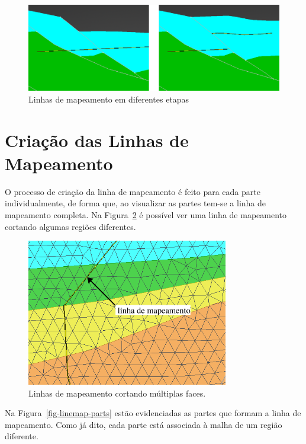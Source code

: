 \begin{figure} [h]
  \begin{center}
    \includegraphics[width=\textwidth]{images/fig-linemap-history}
    \caption{Linhas de mapeamento em diferentes etapas}\label{fig-linemap-history}
  \end{center}
\end{figure}

\section{Criação das Linhas de Mapeamento}

O processo de criação da linha de mapeamento é feito para cada parte individualmente, de forma que, ao visualizar as partes tem-se a linha de mapeamento completa. Na Figura~\ref{fig-linemap-malhas} é possível ver uma linha de mapeamento cortando algumas regiões diferentes.

\begin{figure} [h]
  \begin{center}
    \includegraphics[width=250pt]{images/fig-linhas-de-mapeamento-malhas}
    \caption{Linhas de mapeamento cortando múltiplas faces.}\label{fig-linemap-malhas}
  \end{center}
\end{figure}

Na Figura~\ref{fig-linemap-parts} estão evidenciadas as partes que formam a linha de mapeamento. Como já dito, cada parte está associada à malha de um região diferente.

